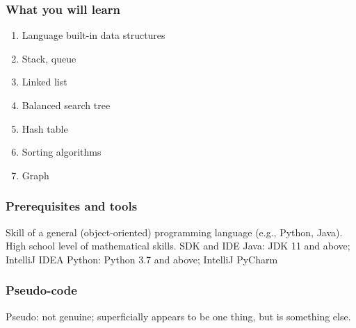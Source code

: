 \documentclass[aspectratio=169, 14pt]{beamer}
\begin{document}
\begin{frame}
    \frametitle{What you will learn}
    \begin{enumerate}
        \item Language built-in data structures
        \item Stack, queue
        \item Linked list
        \item Balanced search tree
        \item Hash table
        \item Sorting algorithms
        \item Graph
    \end{enumerate}
\end{frame}

\begin{frame}
    \frametitle{Prerequisites and tools}
    \begin{outline}
        \1 Skill of a general (\alert{object-oriented}) programming language (e.g., Python, Java).
        \1 High school level of mathematical skills.
        \1 SDK and IDE
            \2 Java: JDK 11 and above; IntelliJ IDEA 
            \2 Python: Python 3.7 and above; IntelliJ PyCharm
    \end{outline}
\end{frame}

\begin{frame}[fragile]
    \frametitle{Pseudo-code}
    Pseudo: not genuine; superficially appears to be one thing, but is something else. 

\end{frame}
\end{document}

